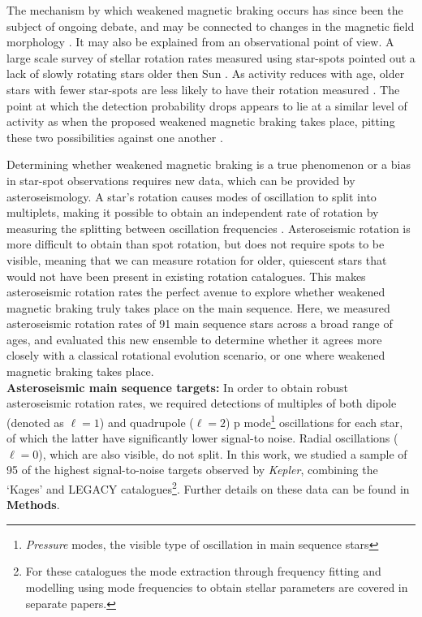 \documentclass[12pt]{article}
\begin{document}
The mechanism by which weakened magnetic braking occurs has since been the subject of ongoing debate, and may be connected to changes in the magnetic field morphology \cite{reville+2015,garraffo+2016, metcalfe+2019, see+2019}. It may also be explained from an observational point of view. A large scale survey of stellar rotation rates measured using star-spots pointed out a lack of slowly rotating stars older then Sun \cite{mcquillan+2014}. As activity reduces with age, older stars with fewer star-spots are less likely to have their rotation measured \cite{matt+2015}. The point at which the detection probability drops appears to lie at a similar level of activity as when the proposed weakened magnetic braking takes place, pitting these two possibilities against one another \cite{vansaders+2019}.

Determining whether weakened magnetic braking is a true phenomenon or a bias in star-spot observations requires new data, which can be provided by asteroseismology. A star's rotation causes modes of oscillation to split into multiplets, making it possible to obtain an independent rate of rotation by measuring the splitting between oscillation frequencies \cite{ledoux1951}. Asteroseismic rotation is more difficult to obtain than spot rotation, but does not require spots to be visible, meaning that we can measure rotation for older, quiescent stars that would not have been present in existing rotation catalogues. This makes asteroseismic rotation rates the perfect avenue to explore whether weakened magnetic braking truly takes place on the main sequence. Here, we measured asteroseismic rotation rates of 91 main sequence stars across a broad range of  ages, and evaluated this new ensemble to determine whether it agrees more closely with a classical rotational evolution scenario, or one where weakened magnetic braking takes place.\\

\textbf{Asteroseismic main sequence targets:} In order to obtain robust asteroseismic rotation rates, we required detections of multiples of both dipole (denoted as $\ell = 1$) and quadrupole ($\ell = 2$) p mode\footnote{\textit{Pressure} modes, the visible type of oscillation in main sequence stars} oscillations for each star, of which the latter have significantly lower signal-to noise. Radial oscillations ($\ell = 0$), which are also visible, do not split. In this work, we studied a sample of 95 of the highest signal-to-noise targets observed by \textit{Kepler}, combining the `Kages' \cite{silvaaguirre+2015,davies+2016} and LEGACY \cite{lund+2017, silvaaguirre+2017} catalogues\footnote{For these catalogues the mode extraction through frequency fitting \cite{davies+2016, lund+2017} and modelling using mode frequencies to obtain stellar parameters \cite{silvaaguirre+2015, silvaaguirre+2017} are covered in separate papers.}. Further details on these data can be found in \textbf{Methods}. 
\end{document}
